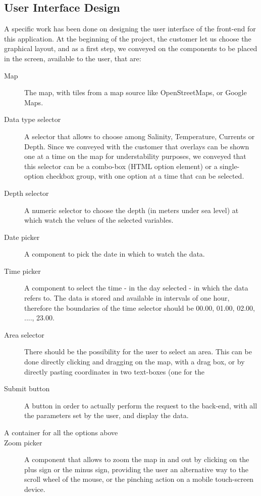 \documentclass[11pt,a4paper,titlepage,oneside]{report}
\begin{document}
\subsection{User Interface Design}
A specific work has been done on designing the user interface of the front-end for this application.
At the beginning of the project, the customer let us choose the graphical layout, and as a first step, we conveyed on the components to be placed in the screen, available to the user, that are:
\begin{description}
\item[Map] The map, with tiles from a map source like OpenStreetMaps, or Google Maps.
\item[Data type selector] A selector that allows to choose among Salinity, Temperature, Currents or Depth. Since we conveyed with the customer that overlays can be shown one at a time on the map for understability purposes, we conveyed that this selector can be a combo-box (HTML option element) or a single-option checkbox group, with one option at a time that can be selected.
\item[Depth selector] A numeric selector to choose the depth (in meters under sea level) at which watch the velues of the selected variables.
\item[Date picker] A component to pick the date in which to watch the data.
\item[Time picker] A component to select the time - in the day selected - in which the data refers to. The data is stored and available in intervals of one hour, therefore the boundaries of the time selector should be 00.00, 01.00, 02.00, ...., 23.00.
\item[Area selector] There should be the possibility for the user to select an area. This can be done directly clicking and dragging on the map, with a drag box, or by directly pasting coordinates in two text-boxes (one for the 
\item[Submit button] A button in order to actually perform the request to the back-end, with all the parameters set by the user, and display the data.
\item[A container for all the options above]
\item[Zoom picker] A component that allows to zoom the map in and out by clicking on the plus sign or the minus sign, providing the user an alternative way to the scroll wheel of the mouse, or the pinching action on a mobile touch-screen device.
\end{description}
\end{document}
